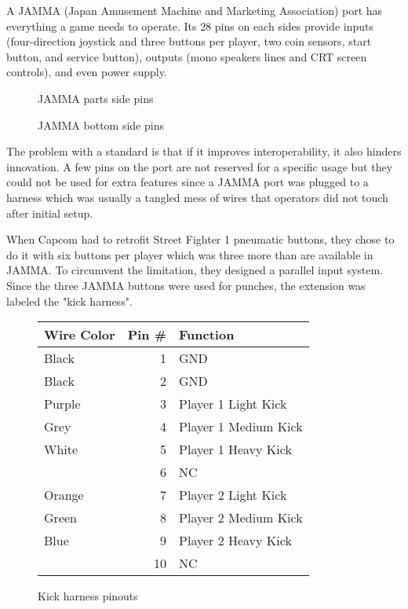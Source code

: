 A JAMMA (Japan Amusement Machine and Marketing Association) port has everything a game needs to operate. Its 28 pins on each sides provide inputs (four-direction joystick and three buttons per player, two coin sensors, start button, and service button), outputs (mono speakers lines and CRT screen controls), and even power supply.

 \begin{figure}[H]
\caption*{JAMMA parts side pins}
\end{figure}

 \begin{figure}[H]
\caption*{JAMMA bottom side pins}
\end{figure}

The problem with a standard is that if it improves interoperability, it also hinders innovation. A few pins on the port are not reserved for a specific usage but they could not be used for extra features since a JAMMA port was plugged to a harness which was usually a tangled mess of wires that operators did not touch after initial setup.

When Capcom had to retrofit Street Fighter 1 pneumatic buttons, they chose to do it with six buttons per player which was three more than are available in JAMMA. To circumvent the limitation, they designed a parallel input system. Since the three JAMMA buttons were used for punches, the extension was labeled the "kick harness".

\begin{figure}[H]

\begin{tabularx}{\textwidth}{lrX}
  \toprule    
  \textbf{Wire Color } & \textbf{ Pin \#}  & \textbf{Function } \\               
  \toprule   
  Black & 1 & GND \\
  Black & 2 & GND \\
  \toprule   
  Purple & 3 & Player 1 Light Kick \\
  Grey & 4 & Player 1 Medium Kick \\
  White & 5 & Player 1 Heavy Kick \\
  \toprule   
  & 6 & NC \\
  \toprule   
  Orange & 7 & Player 2 Light Kick\\
  Green & 8 & Player 2 Medium Kick\\
  Blue & 9 & Player 2 Heavy Kick\\
  \toprule   
  & 10 & NC \\
  \toprule   
\end{tabularx}
\caption*{Kick harness pinouts}
\end{figure}










